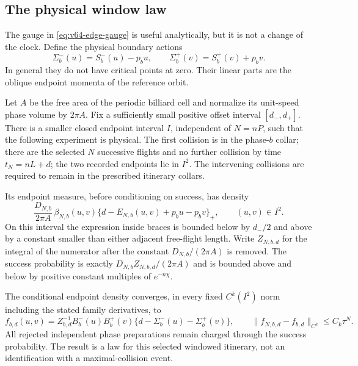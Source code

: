 \subsection{The physical window law}

The gauge in \eqref{eq:v64-edge-gauge} is useful analytically, but it is
not a change of the clock.  Define the physical boundary actions
\begin{equation}\label{eq:v64-physical-actions}
 \Sigma_b^-(u)=S_b^-(u)-p_bu,\qquad
 \Sigma_b^+(v)=S_b^+(v)+p_bv.
\end{equation}
In general they do not have critical points at zero.  Their linear parts
are the oblique endpoint momenta of the reference orbit.

\begin{theorem}
\label{thm:v64-physical-law}
Let $A$ be the free area of the periodic billiard cell and normalize its
unit-speed phase volume by $2\pi A$.  Fix a sufficiently small positive
offset interval $[d_-,d_+]$.  There is a smaller closed endpoint interval
$I$, independent of $N=nP$, such that the following experiment is physical.
The first collision is in the phase-$b$ collar; there are the selected
$N$ successive flights and no further collision by time $t_N=nL+d$;
the two recorded endpoints lie in $I^2$.  The intervening collisions
are required to remain in the prescribed itinerary collars.

Its endpoint measure, before conditioning on success, has density
\begin{equation}\label{eq:v64-phase-density}
 \frac{D_{N,b}}{2\pi A}\,
 \beta_{N,b}(u,v)
       \{d-E_{N,b}(u,v)+p_bu-p_bv\}_+,
 \qquad (u,v)\in I^2.
\end{equation}
On this interval the expression inside braces is bounded below by
$d_-/2$ and above by a constant smaller than either adjacent free-flight
length.  Write $Z_{N,b,d}$ for the integral of the numerator after the
constant $D_{N,b}/(2\pi A)$ is removed.  The success probability is
exactly $D_{N,b}Z_{N,b,d}/(2\pi A)$ and is bounded above and below by
positive constant multiples of $e^{-n\chi}$.

The conditional endpoint density converges, in every fixed $C^k(I^2)$
norm including the stated family derivatives, to
\begin{equation}\label{eq:v64-limit-law}
 f_{b,d}(u,v)=Z_{b,d}^{-1}B_b^-(u)B_b^+(v)
                \{d-\Sigma_b^-(u)-\Sigma_b^+(v)\},
 \qquad \|f_{N,b,d}-f_{b,d}\|_{C^k}\le C_k\tau^N.
\end{equation}
All rejected independent phase preparations remain charged through the
success probability.  The result is a law for this selected windowed
itinerary, not an identification with a maximal-collision event.
\end{theorem}
